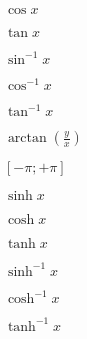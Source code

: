 \documentclass{article}
\begin{document}
$ {\cos {x}} $
\pagebreak

$ {\tan {x}} $
\pagebreak

$ {\sin^{-1} {x}} $
\pagebreak

$ {\cos^{-1} {x}} $
\pagebreak

$ {\tan^{-1} {x}} $
\pagebreak

$ {\arctan(\frac{y}{x})} $
\pagebreak

$ {[-\pi;+\pi]} $
\pagebreak

$ {\sinh {x}} $
\pagebreak

$ {\cosh {x}} $
\pagebreak

$ {\tanh {x}} $
\pagebreak

$ {\sinh^{-1} {x}} $
\pagebreak

$ {\cosh^{-1} {x}} $
\pagebreak

$ {\tanh^{-1} {x}} $
\pagebreak
\end{document}
